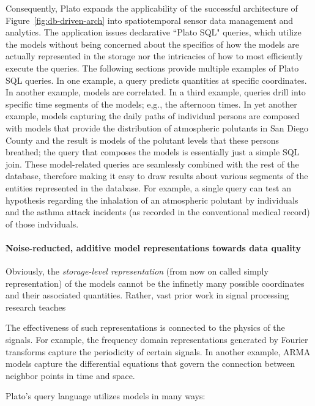 
Consequently, Plato expands the applicability of the successful architecture of Figure~\ref{fig:db-driven-arch} into spatiotemporal sensor data management and analytics. The application issues declarative ``Plato SQL" queries, which utilize the models without being concerned about the specifics of how the models are actually represented in the storage nor the intricacies of how to most efficiently execute the queries. The following sections provide multiple examples of Plato SQL queries. In one example, a query predicts quantities at specific coordinates. In another example, models are correlated. In a third example, queries drill into specific time segments of the models; e,g., the afternoon times. In yet another example, models capturing the daily paths of individual persons are composed with models that provide the distribution of atmospheric polutants in San Diego County and the result is models of the polutant levels that these persons breathed; the query that composes the models is essentially just a simple SQL join. These model-related queries are seamlessly combined with the rest of the database, therefore making it easy to draw results about various segments of the entities represented in the database. For example, a single query can test an hypothesis regarding the inhalation of an atmospheric polutant by individuals and the asthma attack incidents (as recorded in the conventional medical record) of those indviduals.


\paragraph{Noise-reducted, additive model representations towards data quality}
Obviously, the {\em storage-level representation} (from now on called simply representation) of the models cannot be the infinetly many possible coordinates and their associated quantities. Rather, vast prior work in signal processing research teaches 

The effectiveness of such representations is connected to the physics of the signals. For example, the frequency domain representations generated by Fourier transforms capture the periodicity of certain signals. In another example, ARMA models capture the differential equations that govern the connection between neighbor points in time and space.

Plato's query language utilizes models in many ways: 

